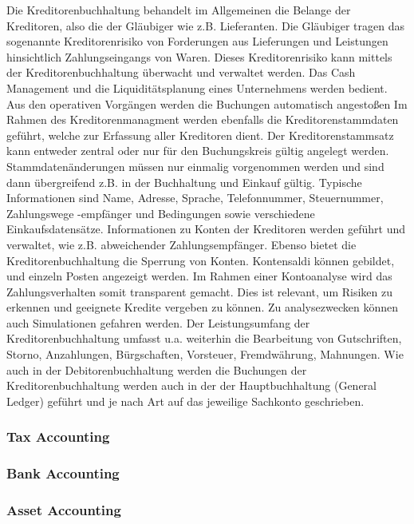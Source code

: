 Die Kreditorenbuchhaltung behandelt im Allgemeinen die Belange der Kreditoren, also die der Gläubiger wie z.B. Lieferanten. Die Gläubiger tragen das sogenannte Kreditorenrisiko von Forderungen aus Lieferungen und Leistungen hinsichtlich Zahlungseingangs von Waren. Dieses Kreditorenrisiko kann mittels der Kreditorenbuchhaltung überwacht und verwaltet werden. Das Cash Management und die Liquiditätsplanung eines Unternehmens werden bedient. \glqq Aus den operativen Vorgängen werden die Buchungen automatisch angestoßen\grqq
Im Rahmen des Kreditorenmanagment werden ebenfalls die Kreditorenstammdaten geführt, welche zur Erfassung aller Kreditoren dient. Der Kreditorenstammsatz kann entweder zentral oder nur für den Buchungskreis gültig angelegt werden. Stammdatenänderungen müssen nur einmalig vorgenommen werden und sind dann übergreifend z.B. in der Buchhaltung und Einkauf gültig. Typische Informationen sind Name, Adresse, Sprache, Telefonnummer, Steuernummer, Zahlungswege -empfänger und Bedingungen sowie verschiedene Einkaufsdatensätze. 
Informationen zu Konten der Kreditoren werden geführt und verwaltet, wie z.B. abweichender Zahlungsempfänger. Ebenso bietet die Kreditorenbuchhaltung die Sperrung von Konten. Kontensaldi können gebildet, und einzeln Posten angezeigt werden. Im Rahmen einer Kontoanalyse wird das Zahlungsverhalten somit transparent gemacht. Dies ist relevant, um Risiken zu erkennen und geeignete Kredite vergeben zu können. Zu analysezwecken können auch Simulationen gefahren werden. Der Leistungsumfang der Kreditorenbuchhaltung umfasst u.a. weiterhin die Bearbeitung von Gutschriften, Storno, Anzahlungen, Bürgschaften, Vorsteuer, Fremdwährung, Mahnungen.
Wie auch in der Debitorenbuchhaltung werden die Buchungen der Kreditorenbuchhaltung werden auch in der der Hauptbuchhaltung (General Ledger) geführt und je nach Art auf das jeweilige Sachkonto geschrieben.



\subsubsection{Tax Accounting} %

\subsubsection{Bank Accounting} %


\subsubsection{Asset Accounting} %



